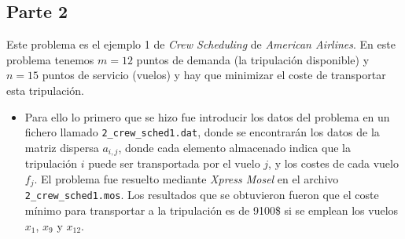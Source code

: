 \documentclass[a4paper,11pt]{article}
\begin{document}
\subsection{Parte 2}

Este problema es el ejemplo 1 de \textit{Crew Scheduling} de \textit{American Airlines}. En este problema tenemos ${m = 12}$ puntos de demanda (la tripulación disponible) y ${n = 15}$ puntos de servicio (vuelos) y hay que minimizar el coste de transportar esta tripulación.

\begin{itemize}\item[]
Para ello lo primero que se hizo fue introducir los datos del problema en un fichero llamado \texttt{2\_crew\_sched1.dat}, donde se encontrarán los datos de la matriz dispersa ${a_{i,j}}$, donde cada elemento almacenado indica que la tripulación ${i}$ puede ser transportada por el vuelo ${j}$, y los costes de cada vuelo ${f_j}$. El problema fue resuelto mediante \textit{Xpress Mosel} en el archivo \texttt{2\_crew\_sched1.mos}. Los resultados que se obtuvieron fueron que el coste mínimo para transportar a la tripulación es de 9100\$ si se emplean los vuelos ${x_1}$, ${x_9}$ y ${x_{12}}$.
\end{itemize}
\end{document}
